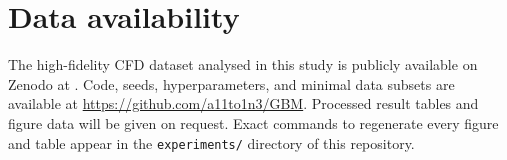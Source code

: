 
\section*{Data availability}
The high-fidelity CFD dataset analysed in this study is publicly available on Zenodo at \citep{CFDdata}. 
Code, seeds, hyperparameters, and minimal data subsets are available at \url{https://github.com/a11to1n3/GBM}. 
Processed result tables and figure data will be given on request. 
Exact commands to regenerate every figure and table appear in the \texttt{experiments/} directory of this repository.
